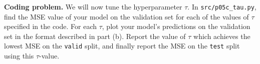 \clearpage
\item {} \textbf{Coding problem.}
We will now tune the hyperparameter $\tau$.
In \texttt{src/p05c\_tau.py}, find the MSE value of your model on the 
validation set for each of the values of $\tau$ specified in the code. For each
$\tau$, plot your model's predictions on the validation set in the format
described in part (b). Report the value of $\tau$ which achieves the lowest MSE
on the \texttt{valid} split, and finally report the MSE on the \texttt{test}
split using this $\tau$-value.

\ifnum{} {
  
} \fi
